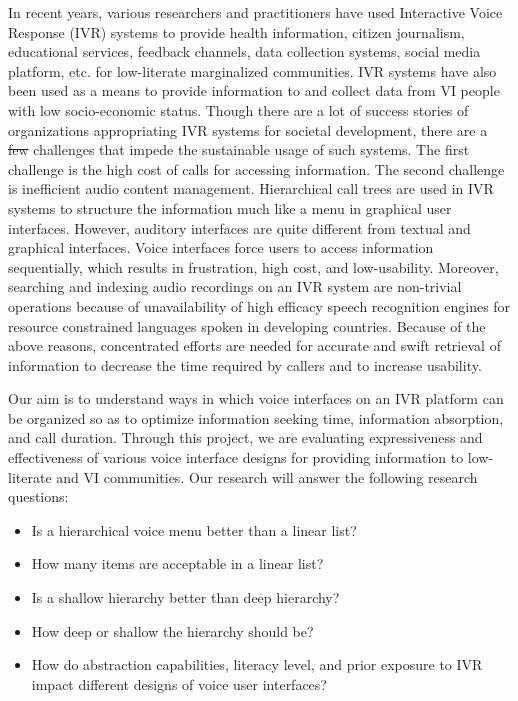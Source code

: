\documentclass{sigchi}
\providecommand{\DIFaddtex}[1]{{\protect\color{blue}\uwave{#1}}} %
\providecommand{\DIFdeltex}[1]{{\protect\color{red}\sout{#1}}}                      %
\providecommand{\DIFaddbegin}{} %
\providecommand{\DIFaddend}{} %
\providecommand{\DIFdelbegin}{} %
\providecommand{\DIFdelend}{} %
\providecommand{\DIFadd}[1]{\texorpdfstring{\DIFaddtex{#1}}{#1}} %
\providecommand{\DIFdel}[1]{\texorpdfstring{\DIFdeltex{#1}}{}} %
\begin{document}
In recent years, various researchers and practitioners have used Interactive Voice Response (IVR) systems to provide health information, citizen journalism, educational services, feedback channels, data collection systems, social media platform, etc. for low-literate marginalized communities. IVR systems have also been used as a means to provide information to and collect data from VI people with low socio-economic status. Though there are a lot of success stories of organizations appropriating IVR systems for societal development, there are a \DIFdelbegin \DIFdel{few }\DIFdelend \DIFaddbegin \DIFadd{number of }\DIFaddend challenges that impede the sustainable usage of such systems. The first challenge is the high cost of calls for accessing information. The second challenge is inefficient audio content management. Hierarchical call trees are used in IVR systems to structure the information much like a menu in graphical user interfaces. However, auditory interfaces are quite different from textual and graphical interfaces. Voice interfaces force users to access information sequentially, which results in frustration, high cost, and low-usability. Moreover, searching and indexing audio recordings on an IVR system are non-trivial operations because of unavailability of high efficacy speech recognition engines for resource constrained languages spoken in developing countries. Because of the above reasons, concentrated efforts are needed for accurate and swift retrieval of information to decrease the time required by callers and to increase usability. 

Our aim is to understand ways in which voice interfaces on an IVR platform can be organized so as to optimize information seeking time, information absorption, and call duration. Through this project, we are evaluating expressiveness and effectiveness of various voice interface designs for providing information to low-literate and VI communities. Our research will answer the following research questions:

\begin{itemize}
\item Is a hierarchical voice menu better than a linear list?
\item How many items are acceptable in a linear list?
\item Is a shallow hierarchy better than deep hierarchy?
\item How deep or shallow the hierarchy should be?
\item How do abstraction capabilities, literacy level, and prior exposure to IVR impact different designs of voice user interfaces? 
\end{itemize}
\end{document}
